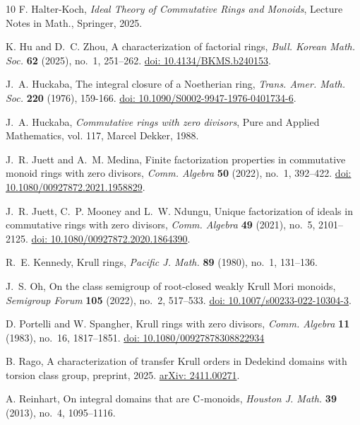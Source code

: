 \documentclass[a4paper, 10pt]{amsart}
\theoremstyle{plain}
\theoremstyle{definition}
\theoremstyle{remark}
\numberwithin{equation}{section}
\begin{document}
\begin{thebibliography}{10}
 F. Halter-Koch, \emph{Ideal {T}heory of {C}ommutative {R}ings and {M}onoids},
  Lecture Notes in Math., Springer, 2025.

 K. Hu and D.~C. Zhou, A characterization of factorial rings, {\it Bull. Korean Math. Soc.} {\bf 62} (2025), no.~1, 251--262. \href{https://doi.org/10.4134/BKMS.b240153}{doi: 10.4134/BKMS.b240153}.

 J.~A. Huckaba, The integral closure of a Noetherian ring, {\it Trans. Amer. Math. Soc.} {\bf 220} (1976), 159-166. \href{https://doi.org/10.1090/S0002-9947-1976-0401734-6}{ doi: 10.1090/S0002-9947-1976-0401734-6}.

 J.~A. Huckaba, \emph{Commutative rings with zero divisors}, Pure and Applied
  Mathematics, vol. 117, Marcel Dekker, 1988.

 J.~R. Juett and A.~M. Medina, Finite factorization properties in commutative monoid rings with zero divisors, {\it Comm. Algebra} {\bf 50} (2022), no.~1, 392--422. \href{https://doi.org/10.1080/00927872.2021.1958829}{doi: 10.1080/00927872.2021.1958829}.

 J.~R. Juett, C.~P. Mooney and L.~W. Ndungu, Unique factorization of ideals in commutative rings with zero divisors, {\it Comm. Algebra }{\bf 49} (2021), no.~5, 2101--2125. \href{https://doi.org/10.1080/00927872.2020.1864390}{doi: 10.1080/00927872.2020.1864390}.

 R.~E. Kennedy, Krull rings, {\it Pacific J. Math.} {\bf 89} (1980), no.~1, 131--136.

 J.~S. Oh, On the class semigroup of root-closed weakly {K}rull {M}ori
  monoids, {\it Semigroup Forum} \textbf{105} (2022), no.~2, 517--533. \href{https://doi.org/10.1007/s00233-022-10304-3}{doi: 10.1007/s00233-022-10304-3}.

 D. Portelli and W. Spangher, Krull rings with zero divisors, {\it Comm. Algebra} {\bf 11} (1983), no.~16, 1817--1851. \href{https://doi.org/10.1080/00927878308822934}{doi: 10.1080/00927878308822934}

 B. Rago, A characterization of transfer {K}rull orders in {D}edekind
  domains with torsion class group, preprint, 2025. \href{https://arxiv.org/abs/2411.00271}{arXiv: 2411.00271}.
  
 A. Reinhart, On integral domains that are $\rm{C}$-monoids, {\it Houston J.
  Math.} \textbf{39} (2013), no.~4, 1095--1116.


\end{thebibliography}
\end{document}
